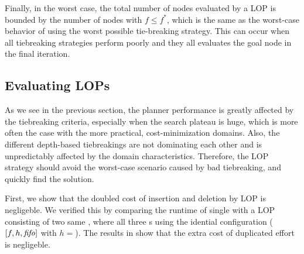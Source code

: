 
Finally, in the worst case, the total number of nodes evaluated by a LOP is bounded by the number of nodes with $f \leq f^*$, which is the same as the worst-case behavior of \astar using the worst possible tie-breaking strategy.
This can occur  when all tiebreaking
strategies perform poorly  and they all evaluates the goal node in the
final iteration.

\subsection{Evaluating LOPs}

As we see in the previous section, the planner performance is greatly
affected by the tiebreaking criteria, especially when the search plateau
is huge, which is more often the case with the more practical,
cost-minimization domains.
% 
Also, the different depth-based tiebreakings are not dominating
each other and is unpredictably affected by the domain characteristics.
% 
Therefore, the LOP strategy should avoid the
worst-case scenario caused by bad tiebreaking, and quickly find the solution.

First, we show that the doubled cost of insertion and deletion by LOP is
negligeble.  We verified this by comparing the runtime of single \astar
with a LOP consisting of two same \astar, where all three \astar{}s
using the idential configuration ($[f,h,\mbox{\textit{fifo}}]$ with $h=$\lmcut). The
results in  show that the extra cost of duplicated effort
is negligeble.

